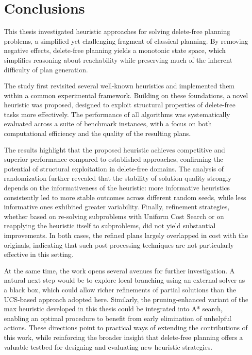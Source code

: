 \chapter{Conclusions}
This thesis investigated heuristic approaches for solving delete-free planning problems, a simplified yet challenging fragment of classical planning.
By removing negative effects, delete-free planning yields a monotonic state space, which simplifies reasoning about reachability while preserving
much of the inherent difficulty of plan generation.

The study first revisited several well-known heuristics and implemented them within a common experimental framework. Building on these foundations,
a novel heuristic was proposed, designed to exploit structural properties of delete-free tasks more effectively. The performance of all algorithms
was systematically evaluated across a suite of benchmark instances, with a focus on both computational efficiency and the quality of the resulting plans.

The results highlight that the proposed heuristic achieves competitive and superior performance compared to established approaches,
confirming the potential of structural exploitation in delete-free domains. The analysis of randomization further revealed that the stability of solution
quality strongly depends on the informativeness of the heuristic: more informative heuristics consistently led to more stable outcomes across different
random seeds, while less informative ones exhibited greater variability. Finally, refinement strategies, whether based on re-solving subproblems with
Uniform Cost Search or on reapplying the heuristic itself to subproblems, did not yield substantial improvements. In both cases,
the refined plans largely overlapped in cost with the originals, indicating that such post-processing techniques are not particularly effective in this setting.

At the same time, the work opens several avenues for further investigation. A natural next step would be to explore local branching using an external
solver as a black box, which could allow richer refinements of partial solutions than the \textsc{UCS}-based approach adopted here.
Similarly, the pruning-enhanced variant of the max heuristic developed in this thesis could be integrated into \textsc{A*} search, enabling an optimal procedure
to benefit from early elimination of unhelpful actions. These directions point to practical ways of extending the contributions of this work,
while reinforcing the broader insight that delete-free planning offers a valuable testbed for designing and evaluating new heuristic strategies.
